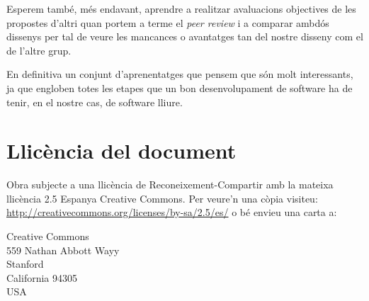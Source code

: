 \documentclass[a4paper,10pt]{article}
\begin{document}
Esperem també, més endavant, aprendre a realitzar avaluacions objectives de les propostes d'altri quan portem a terme el \emph{peer review} i a comparar ambdós dissenys per tal de veure les mancances o avantatges tan del nostre disseny com el de l'altre grup.

En definitiva un conjunt d'aprenentatges que pensem que són molt interessants, ja que engloben totes les etapes que un bon desenvolupament de software ha de tenir, en el nostre cas, de software lliure.

\pagebreak
\section{Llicència del document}
Obra subjecte a una llicència de Reconeixement-Compartir amb la mateixa llicència 2.5 Espanya Creative Commons. Per veure'n una còpia visiteu: \url{http://creativecommons.org/licenses/by-sa/2.5/es/} o bé envieu una carta a:\\
        \begin{center}
        Creative Commons\\
        559 Nathan Abbott Wayy\\
        Stanford\\
        California 94305\\
        USA
        \end{center}
\end{document}
